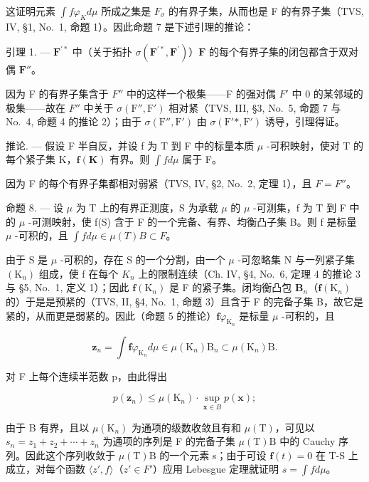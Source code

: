 这证明元素 \(\int f\varphi_{K}d\mu\) 所成之集是 \(F_{\sigma}\) 的有界子集，从而也是 F 的有界子集（TVS, IV, §1, No.~1, 命题 1）。因此命题 7 是下述引理的推论：

引理 1. --- \(\mathbf{F}^{\prime*}\) 中（关于拓扑 \(\sigma(\mathbf{F}^{\prime*},\mathbf{F}^{\prime})\)）\(\mathbf{F}\) 的每个有界子集的闭包都含于双对偶 \(\mathbf{F}''\)。

因为 F 的有界子集含于 \(F''\) 中的这样一个极集——F 的强对偶 \(F'\) 中 0 的某邻域的极集——故在 \(F''\) 中关于 \(\sigma(\mathrm{F}'',\mathrm{F}')\) 相对紧（TVS, III, §3, No.~5, 命题 7 与 No.~4, 命题 4 的推论 2）；由于 \(\sigma(\mathrm{F}'',\mathrm{F}')\) 由 \(\sigma(\mathrm{F}'*,\mathrm{F}')\) 诱导，引理得证。

推论. --- 假设 F 半自反，并设 f 为 T 到 F 中的标量本质 \(\mu\) -可积映射，使对 T 的每个紧子集 K，\(\mathbf{f}(\mathbf{K})\) 有界。则 \(\int f d\mu\) 属于 F。

因为 F 的每个有界子集都相对弱紧（TVS, IV, §2, No.~2, 定理 1），且 \(F = F''\)。

命题 8. --- 设 \(\mu\) 为 T 上的有界正测度，S 为承载 \(\mu\) 的 \(\mu\) -可测集，f 为 T 到 F 中的 \(\mu\) -可测映射，使 f(S) 含于 F 的一个完备、有界、均衡凸子集 B。则 f 是标量 \(\mu\) -可积的，且 \(\int f d\mu \in \mu(T)B \subset F\)。

由于 S 是 \(\mu\) -可积的，存在 S 的一个分割，由一个 \(\mu\) -可忽略集 N 与一列紧子集 \((\mathrm{K}_{n})\) 组成，使 f 在每个 \(K_{n}\) 上的限制连续（Ch. IV, §4, No.~6, 定理 4 的推论 3 与 §5, No.~1, 定义 1）；因此 \(\mathbf{f}(\mathrm{K}_n)\) 是 F 的紧子集。闭均衡凸包 \(\mathbf{B}_n\)（\(\mathbf{f}(\mathrm{K}_n)\) 的）于是是预紧的（TVS, II, §4, No.~1, 命题 3）且含于 F 的完备子集 B，故它是紧的，从而更是弱紧的。因此（命题 5 的推论）\(\mathbf{f}\varphi_{\mathrm{K}_n}\) 是标量 \(\mu\) -可积的，且

\[
\mathbf {z} _ {n} = \int \mathbf {f} \varphi_ {\mathrm{K} _ {n}} d \mu \in \mu (\mathrm{K} _ {n}) \mathrm{B} _ {n} \subset \mu (\mathrm{K} _ {n}) \mathrm{B}.
\]

对 F 上每个连续半范数 p，由此得出

\[
p (\mathbf {z} _ {n}) \leqslant \mu (\mathrm{K} _ {n}) \cdot \sup _ {\mathbf {x} \in B} p (\mathbf {x});
\]

由于 B 有界，且以 \(\mu(\mathrm{K}_{n})\) 为通项的级数收敛且有和 \(\mu(\mathrm{T})\)，可见以 \(s_{n}=z_{1}+z_{2}+\cdots+z_{n}\) 为通项的序列是 F 的完备子集 \(\mu(\mathrm{T})\mathrm{B}\) 中的 Cauchy 序列。因此这个序列收敛于 \(\mu(\mathrm{T})\mathrm{B}\) 的一个元素 s；由于可设 \(\mathbf{f}(t)=0\) 在 T-S 上成立，对每个函数 \(\langle z', f\rangle\)（\(z'\in F'\)）应用 Lebesgue 定理就证明 \(s=\int f d\mu\)。
